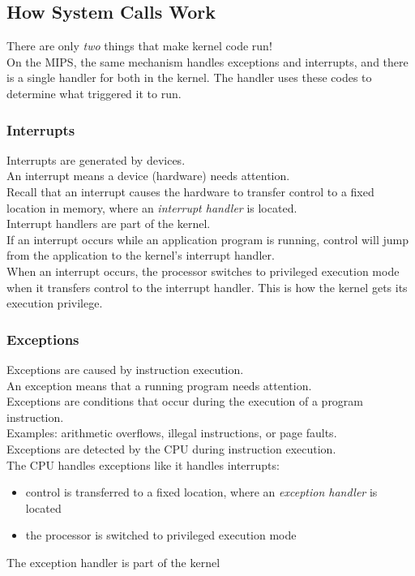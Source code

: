 \documentclass[12pt]{article}
\theoremstyle{plain}
\theoremstyle{definition}
\begin{document}
\subsection{How System Calls Work}
There are only \emph{two} things that make kernel code run! \\

On the MIPS, the same mechanism handles exceptions and interrupts, and there is a single handler for both in the kernel.
The handler uses these codes to determine what triggered it to run.

\subsubsection{Interrupts}
Interrupts are generated by devices. \\
An interrupt means a device (hardware) needs attention. \\

Recall that an interrupt causes the hardware to transfer control to a fixed location in
memory, where an \emph{interrupt handler} is located. \\

Interrupt handlers are part of the kernel. \\
If an interrupt occurs while an application program is running, control will jump from the application to the kernel’s interrupt handler. \\

When an interrupt occurs, the processor switches to privileged execution mode when it transfers control to the interrupt handler.
This is how the kernel gets its execution privilege.

\subsubsection{Exceptions}
Exceptions are caused by instruction execution. \\
An exception means that a running program needs attention. \\

Exceptions are conditions that occur during the execution of a program instruction. \\
Examples: arithmetic overflows, illegal instructions, or page faults. \\

Exceptions are detected by the CPU during instruction execution. \\

The CPU handles exceptions like it handles interrupts:
\begin{itemize}
  \item control is transferred to a fixed location, where an \emph{exception handler} is located
  \item the processor is switched to privileged execution mode
\end{itemize}
The exception handler is part of the kernel \\
\end{document}
